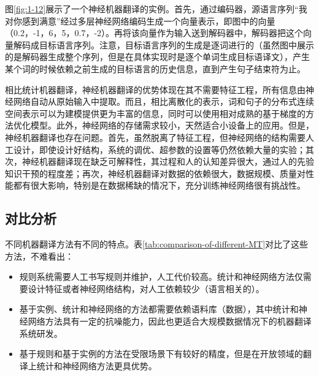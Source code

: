 \parinterval 图\ref{fig:1-12}展示了一个神经机器翻译的实例。首先，通过编码器，源语言序列``我对你感到满意''经过多层神经网络编码生成一个向量表示，即图中的向量（0.2，-1，6，5，0.7，-2）。再将该向量作为输入送到解码器中，解码器把这个向量解码成目标语言序列。注意，目标语言序列的生成是逐词进行的（虽然图中展示的是解码器生成整个序列，但是在具体实现时是逐个单词生成目标语译文），产生某个词的时候依赖之前生成的目标语言的历史信息，直到产生句子结束符为止。

\parinterval 相比统计机器翻译，神经机器翻译的优势体现在其不需要特征工程，所有信息由神经网络自动从原始输入中提取。而且，相比离散化的表示，词和句子的分布式连续空间表示可以为建模提供更为丰富的信息，同时可以使用相对成熟的基于梯度的方法优化模型。此外，神经网络的存储需求较小，天然适合小设备上的应用。但是，神经机器翻译也存在问题。首先，虽然脱离了特征工程，但神经网络的结构需要人工设计，即使设计好结构，系统的调优、超参数的设置等仍然依赖大量的实验；其次，神经机器翻译现在缺乏可解释性，其过程和人的认知差异很大，通过人的先验知识干预的程度差；再次，神经机器翻译对数据的依赖很大，数据规模、质量对性能都有很大影响，特别是在数据稀缺的情况下，充分训练神经网络很有挑战性。


\subsection{对比分析}

\parinterval 不同机器翻译方法有不同的特点。表\ref{tab:comparison-of-different-MT}对比了这些方法，不难看出：

\begin{itemize}
\vspace{0.5em}
\item 规则系统需要人工书写规则并维护，人工代价较高。统计和神经网络方法仅需要设计特征或者神经网络结构，对人工依赖较少（语言相关的）。
\vspace{0.5em}
\item 基于实例、统计和神经网络的方法都需要依赖语料库（数据），其中统计和神经网络方法具有一定的抗噪能力，因此也更适合大规模数据情况下的机器翻译系统研发。
\vspace{0.5em}
\item 基于规则和基于实例的方法在受限场景下有较好的精度，但是在开放领域的翻译上统计和神经网络方法更具优势。
\vspace{0.5em}
\end{itemize}

